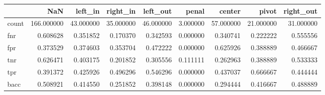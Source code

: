 \begin{tabular}{lrrrrrrrr}
\toprule
{} &         NaN &    left\_in &   right\_in &   left\_out &     penal &     center &      pivot &  right\_out \\
\midrule
count &  166.000000 &  43.000000 &  35.000000 &  46.000000 &  3.000000 &  57.000000 &  21.000000 &  31.000000 \\
fnr   &    0.608628 &   0.351852 &   0.170370 &   0.342593 &  0.000000 &   0.340741 &   0.222222 &   0.555556 \\
fpr   &    0.373529 &   0.374603 &   0.353704 &   0.472222 &  0.000000 &   0.625926 &   0.388889 &   0.466667 \\
tnr   &    0.626471 &   0.403175 &   0.201852 &   0.305556 &  0.111111 &   0.262963 &   0.388889 &   0.533333 \\
tpr   &    0.391372 &   0.425926 &   0.496296 &   0.546296 &  0.000000 &   0.437037 &   0.666667 &   0.444444 \\
bacc  &    0.508921 &   0.414550 &   0.251852 &   0.398148 &  0.000000 &   0.294444 &   0.416667 &   0.488889 \\
\bottomrule
\end{tabular}
